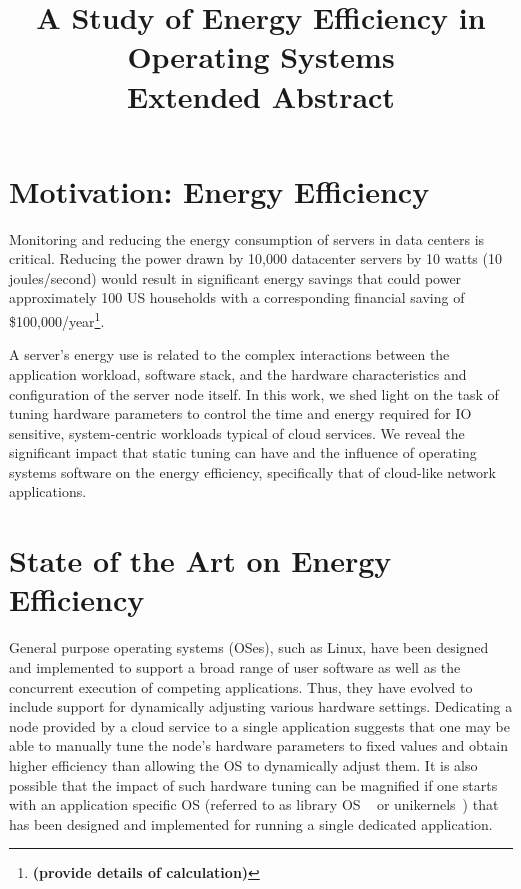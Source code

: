 \documentclass[pageno]{jpaper}
\begin{document}
\title{A Study of Energy Efficiency in Operating Systems \\ \textbf{Extended Abstract}}

\date{}

\maketitle

\thispagestyle{empty}

%
%
%
\section{Motivation: Energy Efficiency}

Monitoring and reducing the energy consumption of servers in data centers is critical.
Reducing the power drawn by 10,000 datacenter servers by 10 watts (10 joules/second) would result in significant energy savings that could power approximately 100 US households with a corresponding financial saving of \$100,000/year\footnote{\textbf{(provide details of calculation)}}.

A server's energy use is related to the complex interactions between the application workload,  software stack, and the hardware characteristics and configuration of the server node itself.
In this work, we shed light on
the task of tuning hardware parameters to control the time and energy required for IO sensitive, system-centric workloads typical of cloud services.
We reveal the significant impact that static  tuning can have and the influence of operating systems software on the energy efficiency, specifically that of cloud-like network applications.

\section{State of the Art on Energy Efficiency}

General purpose operating systems (OSes), such as Linux, have been designed and implemented to support a broad range of user software as well as the concurrent execution of competing applications. Thus, they have evolved to include support for dynamically adjusting various hardware settings.
Dedicating a node provided by a cloud service to a single application suggests that one may be able to manually tune the node's hardware parameters to fixed values and obtain higher efficiency than allowing the OS to dynamically adjust them.  It is also possible that the impact of such hardware tuning can be magnified if one starts with an application specific OS (referred to as library OS ~\cite{ebbrt,ix,arrakis, exokernel} or unikernels~\cite{rumpkernel, unikernels}) that has been designed and implemented for running a single dedicated application.
\end{document}
